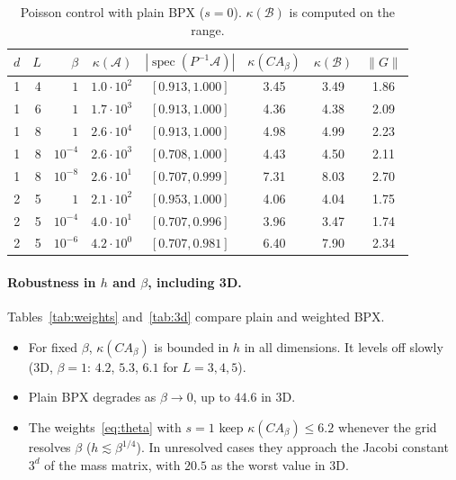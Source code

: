\documentclass[11pt,a4paper]{article}
\newcommand{\A}{\mathcal{A}}
\newcommand{\B}{\mathcal{B}}
\theoremstyle{remark}
\begin{document}
\begin{table}[ht]
\centering\small
\begin{tabular}{rrrrcccc}
\toprule
$d$ & $L$ & $\beta$ & $\kappa(\A)$ & $|\operatorname{spec}(P^{-1}\A)|$ & $\kappa(CA_\beta)$ & $\kappa(\B)$ & $\|G\|$\\
\midrule
1 & 4 & $1$       & $1.0\cdot10^2$ & $[0.913,1.000]$ & 3.45 & 3.49 & 1.86\\
1 & 6 & $1$       & $1.7\cdot10^3$ & $[0.913,1.000]$ & 4.36 & 4.38 & 2.09\\
1 & 8 & $1$       & $2.6\cdot10^4$ & $[0.913,1.000]$ & 4.98 & 4.99 & 2.23\\
1 & 8 & $10^{-4}$ & $2.6\cdot10^3$ & $[0.708,1.000]$ & 4.43 & 4.50 & 2.11\\
1 & 8 & $10^{-8}$ & $2.6\cdot10^1$ & $[0.707,0.999]$ & 7.31 & 8.03 & 2.70\\
2 & 5 & $1$       & $2.1\cdot10^2$ & $[0.953,1.000]$ & 4.06 & 4.04 & 1.75\\
2 & 5 & $10^{-4}$ & $4.0\cdot10^1$ & $[0.707,0.996]$ & 3.96 & 3.47 & 1.74\\
2 & 5 & $10^{-6}$ & $4.2\cdot10^0$ & $[0.707,0.981]$ & 6.40 & 7.90 & 2.34\\
\bottomrule
\end{tabular}
\caption{Poisson control with plain BPX ($s=0$). $\kappa(\B)$ is computed on the range.}
\label{tab:poisson}
\end{table}

\paragraph{Robustness in $h$ and $\beta$, including 3D.}
Tables~\ref{tab:weights} and~\ref{tab:3d} compare plain and weighted BPX.
\begin{itemize}
\item For fixed $\beta$, $\kappa(CA_\beta)$ is bounded in $h$ in all dimensions.
  It levels off slowly (3D, $\beta=1$: $4.2$, $5.3$, $6.1$ for $L=3,4,5$).
\item Plain BPX degrades as $\beta\to0$, up to $44.6$ in 3D.
\item The weights~\eqref{eq:theta} with $s=1$ keep $\kappa(CA_\beta)\le6.2$ whenever
  the grid resolves $\beta$ ($h\lesssim\beta^{1/4}$). In unresolved cases they
  approach the Jacobi constant $3^d$ of the mass matrix, with $20.5$ as
  the worst value in 3D.
\end{itemize}
\end{document}
